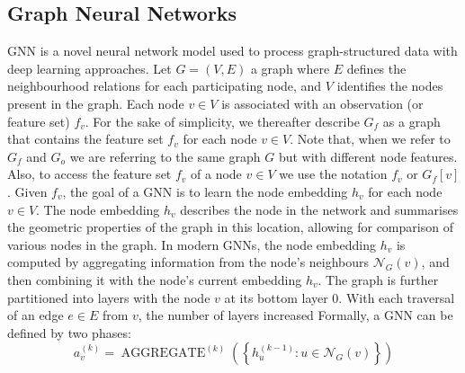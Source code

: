 \documentclass[conference]{IEEEtran}
\begin{document}
\subsection{Graph Neural Networks}
 \ac{GNN} is a novel neural network model used to process graph-structured data with deep learning approaches.
%
Let $G = (V, E)$ a graph  
where $E$ defines the neighbourhood relations for each participating node, 
and $V$ identifies the nodes present in the graph. %
% 
Each node $v \in V$ is associated with an observation (or feature set) $f_v$.
For the sake of simplicity, 
 we thereafter describe $G_f$ as a graph that contains the feature set $f_v$ for each node $v \in V$.
 Note that, when we refer to $G_f$ and $G_o$ we are referring to the same graph $G$ but with different node features.
 Also, to access the feature set $f_v$ of a node $v \in V$ we use the notation $f_v$ or $G_f[v]$.
%
Given $f_v$, %
 the goal of a \ac{GNN} is to learn the node embedding $h_v$ for each node $v \in V$. 
 The node embedding $h_v$ describes the node in the network and summarises the geometric properties of the graph in this location, allowing for comparison of various nodes in the graph.
%
In modern \acp{GNN}, the node embedding $h_v$ is computed by aggregating information from the node's neighbours $\mathcal{N}_G(v)$,
 and then combining it with the node's current embedding $h_v$.
%
The graph is further partitioned into layers with the node $v$ at its bottom layer $0$. 
 With each traversal of an edge $e \in E$ from $v$, the number of layers increased
Formally, a \ac{GNN} can be defined by two phases:
\begin{equation}
a_{v}^{(k)}=\operatorname{AGGREGATE}^{(k)}\left(\left\{h_{u}^{(k-1)}: u \in \mathcal{N}_G(v)\right\}\right)   
\end{equation}
\end{document}

